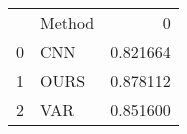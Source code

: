 \begin{tabular}{llr}
 & Method & 0 \\
0 & CNN & 0.821664 \\
1 & OURS & 0.878112 \\
2 & VAR & 0.851600 \\
\end{tabular}
